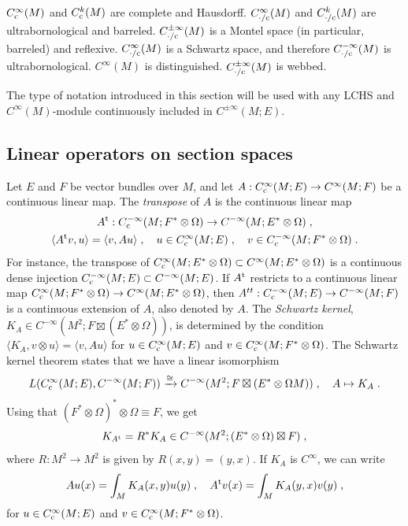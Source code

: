 \documentclass{memo-l}
\theoremstyle{plain}
\theoremstyle{definition}
\theoremstyle{remark}
\newcommand{\co}{{\text{\rm c}}}
\newcommand{\trans}{{\text{\rm t}}}
\newcommand{\Cinftyc}{C^\infty_{\text{\rm c}}}
\numberwithin{section}{chapter}
\numberwithin{equation}{section}%
\begin{document}
$C^{\infty}_\co(M)$ and $C^{k}_\co(M)$ are complete and Hausdorff. $C^{\infty}_{{\cdot}/\co}(M)$ and $C^{k}_{{\cdot}/\co}(M)$ are ultrabornological and barreled. $C^{\pm\infty}_{{\cdot}/\co}(M)$ is a Montel space (in particular, barreled) and reflexive. $C^{\infty}_{{\cdot}/\co}(M)$ is a Schwartz space, and therefore $C^{-\infty}_{{\cdot}/\co}(M)$ is ultrabornological. $C^\infty(M)$ is distinguished. $C^{\pm\infty}_{{\cdot}/\co}(M)$ is webbed.

The type of notation introduced in this section will be used with any LCHS and $C^\infty(M)$-module continuously included in $C^{\pm\infty}(M;E)$.


\subsection{Linear operators on section spaces}\label{ss: ops}

Let $E$ and $F$ be vector bundles over $M$, and let $A:\Cinftyc(M;E)\to C^\infty(M;F)$ be a continuous linear map. The \emph{transpose} of $A$ is the continuous linear map
\begin{gather*}
A^\trans:C^{-\infty}_\co(M;F^*\otimes\Omega)\to C^{-\infty}(M;E^*\otimes\Omega)\;,\\
\langle A^\trans v,u\rangle=\langle v,Au\rangle\;,\quad u\in\Cinftyc(M;E)\;,\quad v\in C^{-\infty}_\co(M;F^*\otimes\Omega)\;.
\end{gather*}
For instance, the transpose of $\Cinftyc(M;E^*\otimes\Omega)\subset C^\infty(M;E^*\otimes\Omega)$ is a continuous dense injection $C^{-\infty}_\co(M;E)\subset C^{-\infty}(M;E)$. If $A^\trans$ restricts to a continuous linear map $\Cinftyc(M;F^*\otimes\Omega)\to C^\infty(M;E^*\otimes\Omega)$, then $A^{tt}:C^{-\infty}_\co(M;E)\to C^{-\infty}(M;F)$ is a continuous extension of $A$, also denoted by $A$. The \emph{Schwartz kernel}, $K_A\in C^{-\infty}(M^2;F\boxtimes(E^*\otimes\Omega))$, is determined by the condition $\langle K_A,v\otimes u\rangle = \langle v,Au\rangle$ for $u\in\Cinftyc(M;E)$ and $v\in\Cinftyc(M;F^*\otimes\Omega)$. The Schwartz kernel theorem \cite[Theorem~5.2.1]{Hormander1971} states that we have a linear isomorphism
\begin{equation}\label{Schwartz kernel theorem}
L(\Cinftyc(M;E),C^{-\infty}(M;F))\xrightarrow{\cong} C^{-\infty}(M^2;F\boxtimes (E^*\otimes\Omega M))\;,\quad 
A\mapsto K_A\;.
\end{equation}
Using that $(F^*\otimes \Omega)^*\otimes \Omega\equiv F$, we get
\[
K_{A^\trans}=R^*K_A\in C^{-\infty}(M^2;(E^*\otimes\Omega)\boxtimes F)\;,
\]
where $R: M^2\to M^2$ is given by $R(x,y)=(y,x)$. If $K_A$ is $C^\infty$, we can write
\begin{equation}\label{Au(y) = int_M K_A(y x) u(x)}
Au(x)=\int_MK_A(x,y)u(y)\;,\quad A^\trans v(x)=\int_MK_A(y,x)v(y)\;,
\end{equation}
for $u\in\Cinftyc(M;E)$ and $v\in\Cinftyc(M;F^*\otimes\Omega)$.
\end{document}

